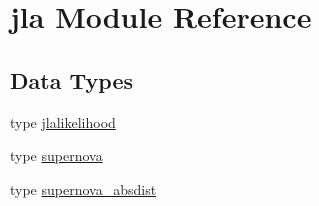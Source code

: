 \hypertarget{namespacejla}{}\section{jla Module Reference}
\label{namespacejla}
\subsection*{Data Types}
\begin{DoxyCompactItemize}
\item 
type \mbox{\hyperlink{structjla_1_1jlalikelihood}{jlalikelihood}}
\item 
type \mbox{\hyperlink{structjla_1_1supernova}{supernova}}
\item 
type \mbox{\hyperlink{structjla_1_1supernova__absdist}{supernova\+\_\+absdist}}
\end{DoxyCompactItemize}
